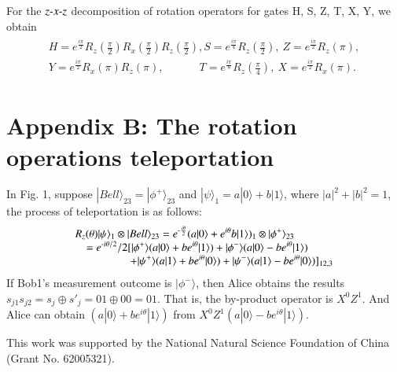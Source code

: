 \documentclass[aps,pra,showpacs,twocolumn,superscriptaddress]{revtex4-1}
\begin{document}
For the $z\textnormal{-}x\textnormal{-}z$ decomposition of rotation operators for gates H, S, Z, T, X, Y, we obtain
\begin{eqnarray*}
\begin{array}{l}
\displaystyle H=e^{\frac{i\pi}{2}}R_z(\frac{\pi}{2})R_x(\frac{\pi}{2})R_z(\frac{\pi}{2}),S=e^{\frac{i \pi}{4}}R_z(\frac{\pi}{2}),\ Z=e^{\frac{i \pi}{2}}R_z(\pi),\\
\displaystyle Y=e^{\frac{i\pi}{2}}R_x(\pi)R_z(\pi),\qquad\quad\ T=e^{\frac{i \pi}{8}}R_z(\frac{\pi}{4}),\  X=e^{\frac{i \pi}{2}}R_x(\pi).
\end{array}
\end{eqnarray*}

\section*{Appendix B: The rotation operations teleportation}
In Fig. 1, suppose $|Bell\rangle_{23}=|\phi^+\rangle_{23}$ and $|\psi\rangle_1=a|0\rangle+b|1\rangle$, where $|a|^2+|b|^2=1$, the process of teleportation is as follows:
\begin{eqnarray*}
\begin{array}{l}
\displaystyle R_z(\theta)|\psi\rangle_1\otimes|Bell\rangle_{23}=e^{\textnormal{-}\frac{i\theta}{2}}(a|0\rangle+e^{i\theta}b|1\rangle)_1\otimes|\phi^+\rangle_{23}\\
\displaystyle \quad=e^{\textnormal{-}i\theta/2}/2[|\phi^+\rangle(a|0\rangle+b e^{i\theta}|1\rangle)+|\phi^-\rangle(a|0\rangle-be^{i\theta}|1\rangle)\\
\displaystyle \qquad\qquad\quad +|\psi^+\rangle(a|1\rangle+be^{i\theta}|0\rangle)+|\psi^-\rangle(a|1\rangle-be^{i\theta}|0\rangle)]_{12,3}
\end{array}
\end{eqnarray*}
If Bob1's measurement outcome is $|\phi^-\rangle$, then Alice obtains the results $s_{j1}s_{j2}=s_j\oplus s'_j=01\oplus00=01$. That is, the by-product operator is $X^0Z^1$. And Alice can obtain $(a|0\rangle+be^{i\theta}|1\rangle)$ from $X^0Z^1(a|0\rangle-be^{i\theta}|1\rangle)$.


\begin{acknowledgments}
This work was supported by the National Natural Science Foundation of China (Grant No. 62005321).
\end{acknowledgments}

%
\end{document}
